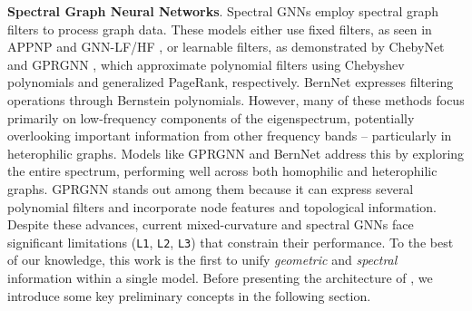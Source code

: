 \textbf{Spectral Graph Neural Networks}. Spectral GNNs employ spectral graph filters \citep{liao2024benchmarking} to process graph data. These models either use fixed filters, as seen in APPNP \citep{gasteiger2018predict} and GNN-LF/HF \citep{zhu2021interpreting}, or learnable filters, as demonstrated by ChebyNet \citep{defferrard2016convolutional} and GPRGNN \citep{chien2020adaptive}, which approximate polynomial filters using Chebyshev polynomials and generalized PageRank, respectively. BernNet \citep{he2021bernnet} expresses filtering operations through Bernstein polynomials. However, many of these methods focus primarily on low-frequency components of the eigenspectrum, potentially overlooking important information from other frequency bands -- particularly in heterophilic graphs. Models like GPRGNN and BernNet address this by exploring the entire spectrum, performing well across both homophilic and heterophilic graphs. GPRGNN stands out among them because it can express several polynomial filters and incorporate node features and topological information. Despite these advances, current mixed-curvature and spectral GNNs face significant limitations (\texttt{L1}, \texttt{L2}, \texttt{L3}) that constrain their performance. To the best of our knowledge, this work is the first to unify \textit{geometric} and \textit{spectral} information within a single model. Before presenting the architecture of \modelname, we introduce some key preliminary concepts in the following section.